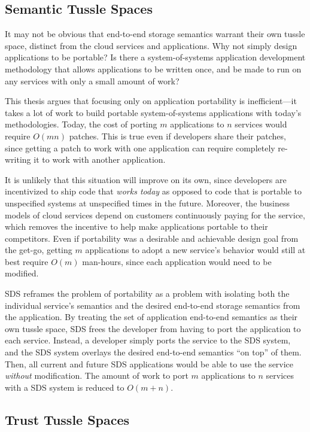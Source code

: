 \subsection{Semantic Tussle Spaces}

It may not be obvious that end-to-end storage semantics warrant their own tussle
space, distinct from the cloud services and applications.  Why not simply
design applications to be portable?  Is there a system-of-systems application
development methodology that allows applications to be written once, and be made
to run on any services with only a small amount of work?

This thesis argues that focusing only on application portability is
inefficient---it takes a lot of work to build portable system-of-systems
applications with today's methodologies.
Today, the cost of porting $m$ applications to $n$ services
would require $O(mn)$ patches.  This is true even if developers share their
patches, since getting a patch to work with one application can require completely
re-writing it to work with another application.

It is unlikely that this situation will improve on its own,
since developers are incentivized to ship code that \emph{works
today} as opposed to code that is portable to unspecified systems at unspecified
times in the future.  Moreover, the business models of cloud services
depend on customers continuously paying for the service, which removes the
incentive to help make applications portable to their competitors.
Even if portability was a desirable and achievable design goal from the get-go,
getting $m$ applications to adopt a new service's behavior would still at best
require $O(m)$ man-hours, since each application would need to be modified.

SDS reframes the problem of portability as a problem with isolating
both the individual service's semantics and the desired end-to-end storage
semantics from the application.  By treating the set of application
end-to-end semantics as their own tussle space, SDS frees the developer from
having to port the application to each service.  Instead, a developer simply
ports the service to the SDS system, and the SDS system overlays the desired
end-to-end semantics ``on top'' of them.  Then, all current and future SDS
applications would be able to use the service \emph{without} modification.
The amount of work to port $m$ applications to $n$ services with a SDS system is reduced to
$O(m+n)$.

\subsection{Trust Tussle Spaces}

